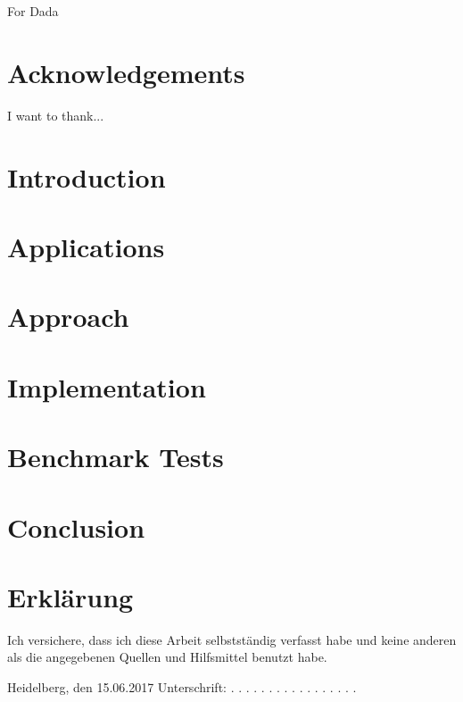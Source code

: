 \documentclass[12pt, twoside]{report}
\begin{document}





\chapter*{}
For Dada

\chapter*{Acknowledgements}
I want to thank...

\tableofcontents

\chapter{Introduction}

\chapter{Applications}

\chapter{Approach}

\chapter{Implementation}

\chapter{Benchmark Tests}

\chapter{Conclusion}


\newpage
\printbibliography 

\chapter*{Erklärung}
 
 
 
Ich versichere, dass ich diese Arbeit selbstständig verfasst habe und keine anderen als die angegebenen Quellen und Hilfsmittel benutzt habe. 
 
 
 
 \vspace{3cm}
 
Heidelberg, den 15.06.2017 \hspace{1cm}                         Unterschrift:  . . . . . . . . . . . . . . . . .
\end{document}
